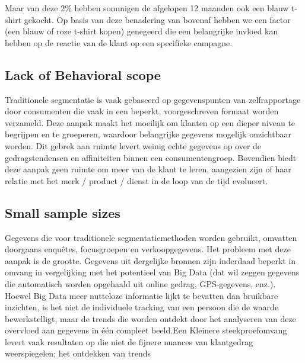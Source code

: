 Maar van deze 2\% hebben sommigen de afgelopen 12 maanden ook een blauw t-shirt gekocht. Op basis van deze benadering van bovenaf hebben we een factor (een blauw of roze t-shirt kopen) genegeerd die een belangrijke invloed kan hebben op de reactie van de klant op een specifieke campagne.

\subsection{Lack of Behavioral scope}
Traditionele segmentatie is vaak gebaseerd op gegevenspunten van zelfrapportage door consumenten die vaak in een beperkt, voorgeschreven formaat worden verzameld. Deze aanpak maakt het moeilijk om klanten op een dieper niveau te begrijpen en te groeperen, waardoor belangrijke gegevens mogelijk onzichtbaar worden. Dit gebrek aan ruimte levert weinig echte gegevens op over de gedragstendensen en affiniteiten binnen een consumentengroep. Bovendien biedt deze aanpak geen ruimte om meer van de klant te leren, aangezien zijn of haar relatie met het merk / product / dienst in de loop van de tijd evolueert. 

\subsection{Small sample sizes}
Gegevens die voor traditionele segmentatiemethoden worden gebruikt, omvatten doorgaans enquêtes, focusgroepen en verkoopgegevens. Het probleem met deze aanpak is de grootte. Gegevens uit dergelijke bronnen zijn inderdaad beperkt in omvang in vergelijking met het potentieel van Big Data (dat wil zeggen gegevens die automatisch worden opgehaald uit online gedrag, GPS-gegevens, enz.). Hoewel Big Data meer nutteloze informatie lijkt te bevatten dan bruikbare inzichten, is het niet de individuele tracking van een persoon die de waarde bewerkstelligt, maar de trends die worden ontdekt door het analyseren van deze overvloed aan gegevens in één compleet beeld.Een Kleinere steekproefomvang levert vaak resultaten op die niet de fijnere nuances van klantgedrag weerspiegelen; het ontdekken van trends

